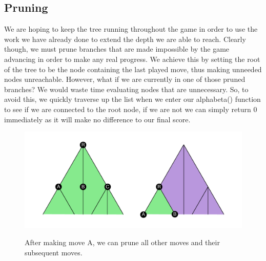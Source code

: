 \documentclass[a4paper, 12pt]{article}
\begin{document}
\subsection{Pruning}
We are hoping to keep the tree running throughout the game in order to use the work we have already done to extend the depth we are able to reach. Clearly though, we must prune branches that are made impossible by the game advancing in order to make any real progress. We achieve this by setting the root of the tree to be the node containing the last played move, thus making unneeded nodes unreachable. However, what if we are currently in one of those pruned branches? We would waste time evaluating nodes that are unnecessary. So, to avoid this,  we quickly traverse up the list when we enter our alphabeta() function to see if we are connected to the root node, if we are not we can simply return 0 immediately as it will make no difference to our final score.
\begin{figure}[h!]
  \centering
  	\includegraphics[width = 17cm]{TreePruning}\\
  \caption{After making move A, we can prune all other moves and their subsequent moves.}
\end{figure}
\end{document}
